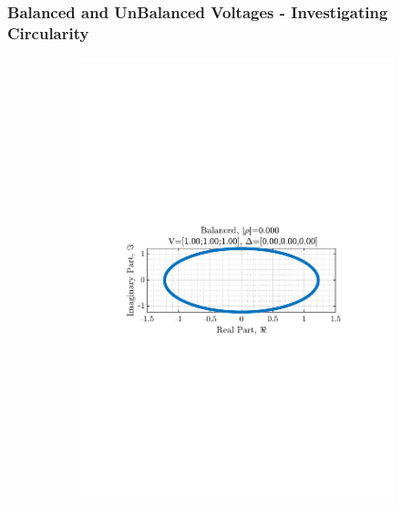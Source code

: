 \documentclass[12pt]{article}
\numberwithin{equation}{section}
\begin{document}
		\subsubsection{Balanced and UnBalanced Voltages - Investigating Circularity}
			\begin{figure}[H]
				\centering
				\begin{subfigure}{0.49\textwidth}
					\centering
					\includegraphics[trim={2.2cm 11.2cm 3.00cm  11.2cm}, clip, width=\textwidth]{../MATLAB/figures/q3_1c_fig01.pdf} 
					\captionsetup{justification=centering}
				\end{subfigure}
				\begin{subfigure}{0.49\textwidth}
					\centering

\end{subfigure}
\end{figure}
\end{document}
